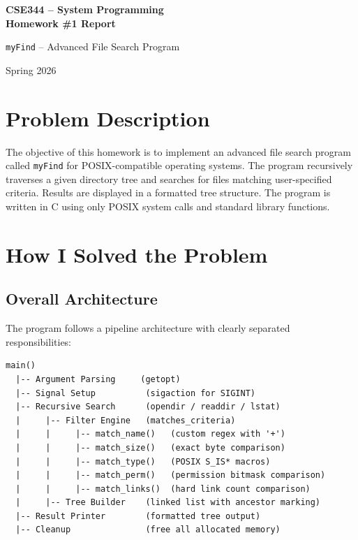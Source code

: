 \documentclass[12pt,a4paper]{article}
\begin{document}
\begin{titlepage}
    \centering
    \vspace*{3cm}
    {\Huge\bfseries CSE344 -- System Programming\\[0.3cm]
    Homework \#1 Report\par}
    \vspace{1.5cm}
    {\LARGE\texttt{myFind} -- Advanced File Search Program\par}
    \vspace{2cm}
    {\Large Spring 2026\par}
    \vfill
\end{titlepage}

\tableofcontents
\newpage

\section{Problem Description}

The objective of this homework is to implement an advanced file search program called \texttt{myFind} for POSIX-compatible operating systems. The program recursively traverses a given directory tree and searches for files matching user-specified criteria. Results are displayed in a formatted tree structure. The program is written in C using only POSIX system calls and standard library functions.

\section{How I Solved the Problem}

\subsection{Overall Architecture}

The program follows a pipeline architecture with clearly separated responsibilities:

\begin{lstlisting}[language={},numbers=none]
main()
  |-- Argument Parsing     (getopt)
  |-- Signal Setup          (sigaction for SIGINT)
  |-- Recursive Search      (opendir / readdir / lstat)
  |     |-- Filter Engine   (matches_criteria)
  |     |     |-- match_name()   (custom regex with '+')
  |     |     |-- match_size()   (exact byte comparison)
  |     |     |-- match_type()   (POSIX S_IS* macros)
  |     |     |-- match_perm()   (permission bitmask comparison)
  |     |     |-- match_links()  (hard link count comparison)
  |     |-- Tree Builder    (linked list with ancestor marking)
  |-- Result Printer        (formatted tree output)
  |-- Cleanup               (free all allocated memory)
\end{lstlisting}
\end{document}
